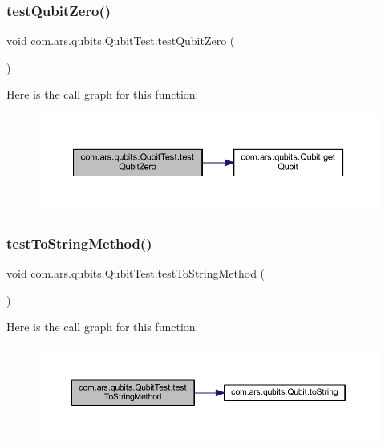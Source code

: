 \subsubsection{\texorpdfstring{test\+Qubit\+Zero()}{testQubitZero()}}
{\footnotesize\ttfamily void com.\+ars.\+qubits.\+Qubit\+Test.\+test\+Qubit\+Zero (\begin{DoxyParamCaption}{ }\end{DoxyParamCaption})}

Here is the call graph for this function\+:\nopagebreak
\begin{figure}[H]
\begin{center}
\leavevmode
\includegraphics[width=350pt]{classcom_1_1ars_1_1qubits_1_1_qubit_test_afd0454df241a37488becb51d06c76f25_cgraph}
\end{center}
\end{figure}
\hypertarget{classcom_1_1ars_1_1qubits_1_1_qubit_test_ae19a6ea1a98159a12bb718310869ff39}{}\label{classcom_1_1ars_1_1qubits_1_1_qubit_test_ae19a6ea1a98159a12bb718310869ff39} 
\subsubsection{\texorpdfstring{test\+To\+String\+Method()}{testToStringMethod()}}
{\footnotesize\ttfamily void com.\+ars.\+qubits.\+Qubit\+Test.\+test\+To\+String\+Method (\begin{DoxyParamCaption}{ }\end{DoxyParamCaption})}

Here is the call graph for this function\+:\nopagebreak
\begin{figure}[H]
\begin{center}
\leavevmode
\includegraphics[width=350pt]{classcom_1_1ars_1_1qubits_1_1_qubit_test_ae19a6ea1a98159a12bb718310869ff39_cgraph}
\end{center}
\end{figure}
\hypertarget{classcom_1_1ars_1_1qubits_1_1_qubit_test_add210bf06395e140f80609f097df4a2c}{}\label{classcom_1_1ars_1_1qubits_1_1_qubit_test_add210bf06395e140f80609f097df4a2c} 
